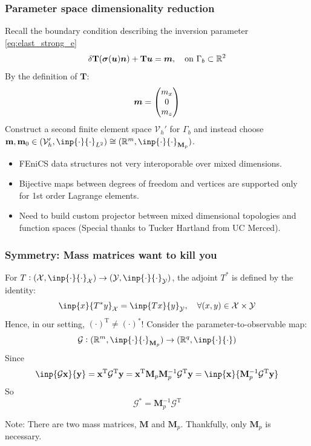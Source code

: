\documentclass[
  pdf,
  10pt,
  xcolor={svgnames},
]{beamer}
\newcommand{\mc}[1]{\mathcal{#1}}
\newcommand{\R}{\mathbb{R}}
\newcommand{\T}{\mathrm{T}}
\renewcommand{\vec}[1]{{\mathchoice
                     {\mbox{\boldmath$\displaystyle{#1}$}}
                     {\mbox{\boldmath$\textstyle{#1}$}}
                     {\mbox{\boldmath$\scriptstyle{#1}$}}
                     {\mbox{\boldmath$\scriptscriptstyle{#1}$}}}}
\newcommand{\mat}[1]{\mathbf{{#1}}}
\begin{document}
\begin{frame}
  \frametitle{Parameter space dimensionality reduction}
  Recall the boundary condition describing the inversion parameter
  \eqref{eq:elast_strong_e}
  \[
    \delta \mat{T}(\vec{\sigma}(\vec{u}) \vec{n}) + \mat{T}\vec{u}
    = \vec{m}
    , \quad \text{on } \Gamma_b \subset \R^2
  \]
  By the definition of $\mat{T}$:
  \[
    \vec{m} = \begin{pmatrix} m_x \\ 0 \\ m_z \end{pmatrix}
  \]
  Construct a second finite element space $\mc{V}_h'$ for $\Gamma_b$ and instead
  choose $\vb{m}, \vb{m}_0 \in (\mc{V}_h', \inp{\cdot}{\cdot}_{L^2}) \cong
  (\R^m, \inp{\cdot}{\cdot}_{\mat{M}_p})$.
  \pause 
  \begin{itemize}[<+->]
    \item FEniCS data structures not very interoporable over mixed dimensions.
    \item Bijective maps between degrees of freedom and vertices are supported
      only for 1st order Lagrange elements.
    \item Need to build custom projector between mixed dimensional topologies
      and function spaces (Special thanks to Tucker Hartland from UC Merced).
  \end{itemize}
\end{frame}

\begin{frame}
  \frametitle{Symmetry: Mass matrices want to kill you}
  For $T: (\mc{X}, \inp{\cdot}{\cdot}_\mc{X}) \to (\mc{Y},
  \inp{\cdot}{\cdot}_\mc{Y})$, the adjoint $T^*$ is defined by the identity:
  \[
    \inp{x}{T^*y}_\mc{X} = \inp{Tx}{y}_\mc{Y}
    , \quad \forall (x,y) \in \mc{X} \times \mc{Y}
  \]
  Hence, in our setting, $(\cdot)^\T \neq (\cdot)^*$!
  \pause
  Consider the parameter-to-observable map:
  \[
    \mc{G}:
    (\R^m, \inp{\cdot}{\cdot}_{\mat{M}_p}) \to (\R^q, \inp{\cdot}{\cdot})
  \]
  Since
  \[
    \inp{\mc{G}\vb{x}}{\vb{y}}
    = \vb{x}^\T \mc{G}^\T \vb{y}
    = \vb{x}^\T \mat{M}_p \mat{M}_p^{-1} \mc{G}^\T  \vb{y}
    = \inp{\vb{x}}{\mat{M}_p^{-1} \mc{G}^\T \vb{y}}
  \]
  So
  \[
    \mc{G}^* = \mat{M}_p^{-1}\mc{G}^\T
  \]
  \pause
  \vspace{-1em}
  \begin{alertblock}{Note:}
    There are two mass matrices, $\mat{M}$ and $\mat{M}_p$. Thankfully, only
    $\mat{M}_p$ is necessary.
  \end{alertblock}
\end{frame}
\end{document}
